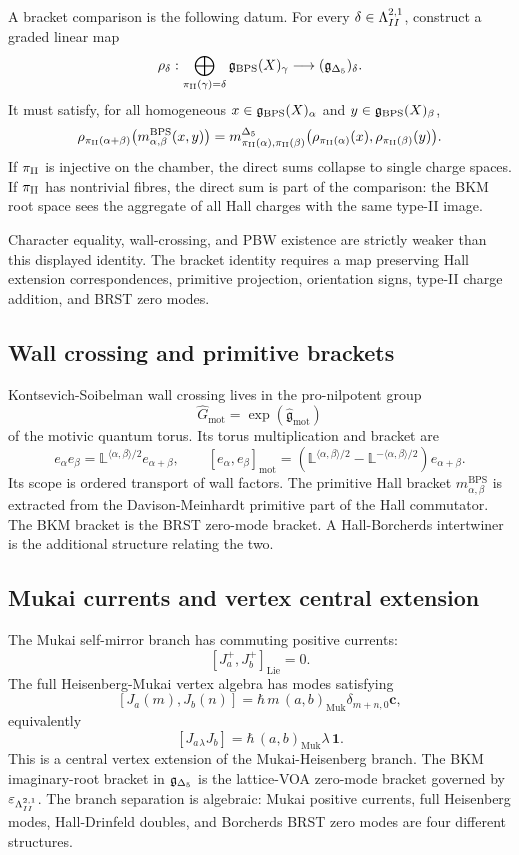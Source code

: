 A bracket comparison is the following datum.  For every
\(\delta\in\Lambda^{2,1}_{II}\), construct a graded linear map
\[
  \rho_\delta:
  \bigoplus_{\pi_{\mathrm{II}}(\gamma)=\delta}\mathfrak{g}_{\mathrm{BPS}}(X)_\gamma
  \longrightarrow
  (\mathfrak{g}_{\Delta_5})_\delta .
\]
It must satisfy, for all homogeneous \(x\in\mathfrak{g}_{\mathrm{BPS}}(X)_\alpha\) and
\(y\in\mathfrak{g}_{\mathrm{BPS}}(X)_\beta\),
\[
  \rho_{\pi_{\mathrm{II}}(\alpha+\beta)}
  \bigl(m^{\mathrm{BPS}}_{\alpha,\beta}(x,y)\bigr)
  =
  m^{\Delta_5}_{\pi_{\mathrm{II}}(\alpha),\pi_{\mathrm{II}}(\beta)}
  \bigl(\rho_{\pi_{\mathrm{II}}(\alpha)}(x),\rho_{\pi_{\mathrm{II}}(\beta)}(y)\bigr).
\]
If \(\pi_{\mathrm{II}}\) is injective on the chamber, the direct sums collapse to
single charge spaces.  If \(\pi_{\mathrm{II}}\) has nontrivial fibres, the direct
sum is part of the comparison: the BKM root space sees the aggregate
of all Hall charges with the same type-II image.

Character equality, wall-crossing, and PBW existence are strictly
weaker than this displayed identity.  The bracket identity requires a
map preserving Hall extension correspondences, primitive projection,
orientation signs, type-II charge addition, and BRST zero modes.

\subsection*{Wall crossing and primitive brackets}

Kontsevich-Soibelman wall crossing lives in the pro-nilpotent group
\[
  \widehat G_{\mathrm{mot}}=\exp(\widehat{\mathfrak g}_{\mathrm{mot}})
\]
of the motivic quantum torus.  Its torus multiplication and bracket are
\[
  e_\alpha e_\beta
  =
  \mathbb L^{\langle\alpha,\beta\rangle/2}e_{\alpha+\beta},
  \qquad
  [e_\alpha,e_\beta]_{\mathrm{mot}}
  =
  \left(
    \mathbb L^{\langle\alpha,\beta\rangle/2}
    -
    \mathbb L^{-\langle\alpha,\beta\rangle/2}
  \right)e_{\alpha+\beta}.
\]
Its scope is ordered transport of wall factors.  The primitive
Hall bracket \(m^{\mathrm{BPS}}_{\alpha,\beta}\) is extracted from the
Davison-Meinhardt primitive part of the Hall commutator.  The BKM
bracket is the BRST zero-mode bracket.  A Hall-Borcherds intertwiner is
the additional structure relating the two.

\subsection*{Mukai currents and vertex central extension}

The Mukai self-mirror branch has commuting positive currents:
\[
  [J_a^+,J_b^+]_{\mathrm{Lie}}=0 .
\]
The full Heisenberg-Mukai vertex algebra has modes satisfying
\[
  [J_a(m),J_b(n)]
  =
  \hbar\,m\,(a,b)_{\mathrm{Muk}}\delta_{m+n,0}\mathbf c,
\]
equivalently
\[
  [J_a{}_\lambda J_b]=\hbar\,(a,b)_{\mathrm{Muk}}\lambda\,\mathbf 1 .
\]
This is a central vertex extension of the Mukai-Heisenberg branch.  The
BKM imaginary-root bracket in \(\mathfrak{g}_{\Delta_5}\) is the lattice-VOA zero-mode
bracket governed by \(\varepsilon_{\Lambda^{2,1}_{II}}\).  The branch separation is algebraic:
Mukai positive currents, full Heisenberg modes, Hall-Drinfeld doubles,
and Borcherds BRST zero modes are four different structures.

